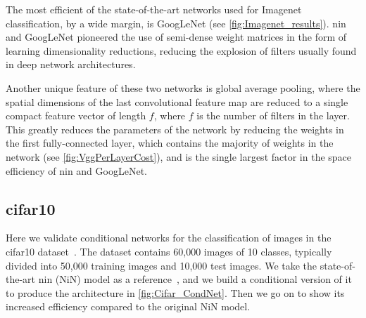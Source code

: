 \documentclass[thesis]{subfiles}
\begin{document}
	The most efficient of the state-of-the-art networks used for Imagenet classification, by a wide margin, is GoogLeNet (see \cref{fig:Imagenet_results}). \gls{nin} and GoogLeNet pioneered the use of semi-dense weight matrices in the form of learning dimensionality reductions, reducing the explosion of filters usually found in deep network architectures.
	
	Another unique feature of these two networks is global average pooling, where the spatial dimensions of the last convolutional feature map are reduced to a single compact feature vector of length $f$, where $f$ is the number of filters in the layer. This greatly reduces the parameters of the network by reducing the weights in the first fully-connected layer, which contains the majority of weights in the network (see \cref{fig:VggPerLayerCost}), and is the single largest factor in the space efficiency of \gls{nin} and GoogLeNet.
	
	
	\subsection{\gls{cifar10}}
	Here we validate conditional networks for the classification of images in the \gls{cifar10} dataset~\citep{CIFAR10}. 
	The dataset contains 60,000 images of 10 classes, typically divided into 50,000 training images and 10,000 test images. 
	We take the state-of-the-art \gls{nin} (NiN) model 
	as a reference~\citep{Lin2013NiN}, and we build a conditional version of it to produce the architecture in \cref{fig:Cifar_CondNet}. 
	Then we go on to show its increased efficiency compared to the original NiN model.
	
\end{document}
